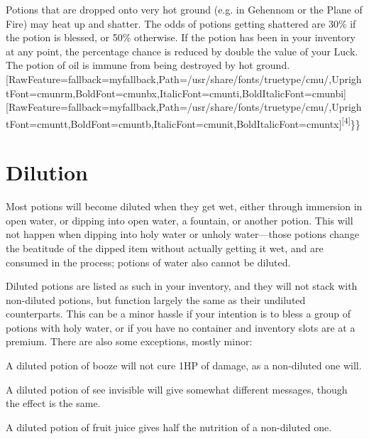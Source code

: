 Potions that are dropped onto very hot ground (e.g. in Gehennom or the Plane of Fire) may heat up and shatter. The odds of potions getting shattered are 30\% if the potion is blessed, or 50\% otherwise. If the potion has been in your inventory at any point, the percentage chance is reduced by double the value of your Luck\footnotemark[242]. The potion of oil\footnotemark[243] is immune from being destroyed by hot ground.\allowbreak{}\setmainfont{cmunrm.ttf}[RawFeature={fallback=myfallback},Path=/usr/share/fonts/truetype/cmu/,UprightFont=cmunrm,BoldFont=cmunbx,ItalicFont=cmunti,BoldItalicFont=cmunbi]\setmonofont{cmunrm.ttf}[RawFeature={fallback=myfallback},Path=/usr/share/fonts/truetype/cmu/,UprightFont=cmuntt,BoldFont=cmuntb,ItalicFont=cmunit,BoldItalicFont=cmuntx]\textsuperscript{{$\text{[}$}4{$\text{]}$}}\}\}



\section{Dilution}
\label{12}
Most potions will become diluted when they get wet\footnotemark[244], either through immersion in open water, or dipping\footnotemark[245] into open water, a fountain, or another potion. This will not happen when dipping into holy water or unholy water{\mbox{$\text{---}$}}those potions change the beatitude\footnotemark[246] of the dipped item without actually getting it wet, and are consumed in the process; potions of water also cannot be diluted.


Diluted potions are listed as such in your inventory, and they will not stack with non-{}diluted potions, but function largely the same as their undiluted counterparts. This can be a minor hassle if your intention is to bless a group of potions with holy water, or if you have no container\footnotemark[247] and inventory slots are at a premium. There are also some exceptions, mostly minor:




\begin{myitemize}\item{}A diluted potion of booze will not cure 1HP of damage, as a non-{}diluted one will.
\item{}A diluted potion of see invisible will give somewhat different messages, though the effect is the same.
\item{}A diluted potion of fruit juice gives half the nutrition of a non-{}diluted one.
\end{myitemize}

